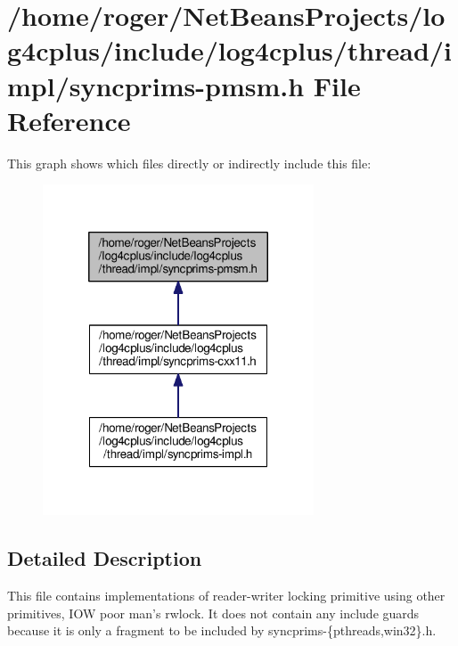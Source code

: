 \hypertarget{syncprims-pmsm_8h}{\section{/home/roger/\-Net\-Beans\-Projects/log4cplus/include/log4cplus/thread/impl/syncprims-\/pmsm.h File Reference}
\label{syncprims-pmsm_8h}
}
This graph shows which files directly or indirectly include this file\-:
\nopagebreak
\begin{figure}[H]
\begin{center}
\leavevmode
\includegraphics[width=228pt]{syncprims-pmsm_8h__dep__incl}
\end{center}
\end{figure}


\subsection{Detailed Description}
This file contains implementations of reader-\/writer locking primitive using other primitives, I\-O\-W poor man's rwlock. It does not contain any include guards because it is only a fragment to be included by syncprims-\/\{pthreads,win32\}.h. 